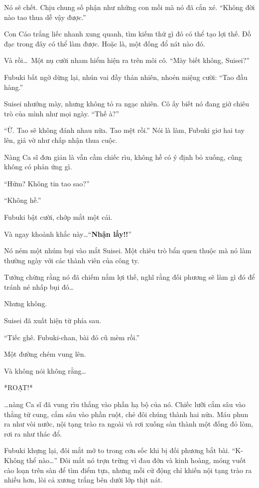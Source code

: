 \documentclass[../main.tex]{subfiles}
\begin{document}
Nó sẽ chết. Chịu chung số phận như những con mồi mà nó đã cắn xé. ``Không đời nào tao thua dễ vậy được.''

Con Cáo trắng liếc nhanh xung quanh, tìm kiếm thứ gì đó có thể tạo lợi thế. Đồ đạc trong đây có thể làm được. Hoặc là, một đống đổ nát nào đó.

Và rồi\dots\ Một nụ cười nham hiểm hiện ra trên môi cô. ``Mày biết không, Suisei?''

Fubuki bất ngờ dừng lại, nhún vai đầy thản nhiên, nhoẻn miệng cười: ``Tao đầu hàng.''

Suisei nhướng mày, nhưng không tỏ ra ngạc nhiên. Cô ấy biết nó đang giở chiêu trò của mình như mọi ngày. ``Thế à?''

``Ừ. Tao sẽ không đánh nhau nữa. Tao mệt rồi.'' Nói là làm, Fubuki giơ hai tay lên, giả vờ như chấp nhận thua cuộc.

Nàng Ca sĩ đơn giản là vẫn cầm chiếc rìu, không hề có ý định bỏ xuống, cũng không có phản ứng gì.

``Hửm? Không tin tao sao?''

``Không hề.''

Fubuki bật cười, chớp mắt một cái.

Và ngay khoảnh khắc này\dots ``\textbf{Nhận lấy!!}''

Nó ném một nhúm bụi vào mắt Suisei. Một chiêu trò bẩn quen thuộc mà nó làm thường ngày với các thành viên của công ty.

Tưởng chừng rằng nó đã chiếm nắm lợi thế, nghĩ rằng đối phương sẽ làm gì đó để tránh né nhấp bụi đó\dots

Nhưng không.

Suisei đã xuất hiện từ phía sau.

``Tiếc ghê. Fubuki-chan, bài đó cũ mèm rồi.''

Một đường chém vung lên.

Và không nói không rằng\dots

*ROẠT!*

\dots nàng Ca sĩ đã vung rìu thẳng vào phần hạ bộ của nó. Chiếc lưỡi cắm sâu vào thẳng tử cung, cắm sâu vào phần ruột, chẻ đôi chúng thành hai nửa. Máu phun ra như vòi nước, nội tạng trào ra ngoài và rơi xuống sàn thành một đống đỏ lòm, rơi ra như thác đổ.

Fubuki khựng lại, đôi mắt mở to trong cơn sốc khi bị đối phương bắt bài. ``K-Không thể nào\dots'' Đôi mắt nó trợn trừng vì đau đớn và kinh hoàng, móng vuốt cào loạn trên sàn để tìm điểm tựa, nhưng mỗi cử động chỉ khiến nội tạng trào ra nhiều hơn, lòi cả xương trắng bên dưới lớp thịt nát.
\end{document}
